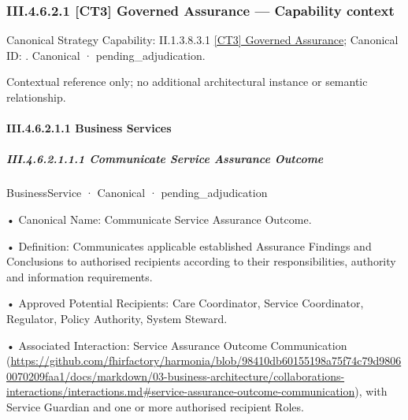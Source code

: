 \subsubsection*{III.4.6.2.1 [CT3] Governed Assurance — Capability context}
\label{navigation:III.4.6.2.1}

{\small Canonical Strategy Capability: II.1.3.8.3.1 \hyperref[element:da1a983d4dcf4d5bb772b8f69bc08426]{[CT3] Governed Assurance}; Canonical ID: \texttt{}. Canonical · pending\_adjudication.}\par
Contextual reference only; no additional architectural instance or semantic relationship.\par
\paragraph*{III.4.6.2.1.1 Business Services}
\label{navigation:III.4.6.2.1.1}

\subparagraph*{III.4.6.2.1.1.1 Communicate Service Assurance Outcome}
\label{navigation:III.4.6.2.1.1.1}

\label{element:371b04d6bbf84b53a3c5667ae6df2809}
{\small BusinessService · Canonical · pending\_adjudication}\par

•
Canonical Name: Communicate Service Assurance Outcome.



•
Definition: Communicates applicable established Assurance Findings and Conclusions to authorised recipients according to their responsibilities, authority and information requirements.



•
Approved Potential Recipients: Care Coordinator, Service Coordinator, Regulator, Policy Authority, System Steward.



•
Associated Interaction: Service Assurance Outcome Communication (\url{https://github.com/fhirfactory/harmonia/blob/98410db60155198a75f74c79d98060070209faa1/docs/markdown/03-business-architecture/collaborations-interactions/interactions.md#service-assurance-outcome-communication}), with Service Guardian and one or more authorised recipient Roles.



